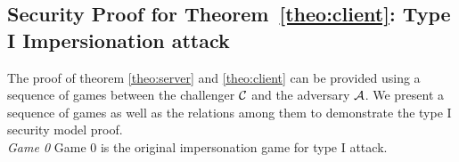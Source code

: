 \subsection{Security Proof for Theorem~\ref{theo:client}: Type I Impersionation attack}
The proof of theorem \ref{theo:server} and \ref{theo:client} can be provided
using a sequence of games between the challenger $\mathcal{C}$ and the adversary
$\mathcal{A}$. We present a sequence of games as well as the relations among them to demonstrate the type I security model proof.\\
\textit{Game 0} Game 0 is the original impersonation game for type I attack.
